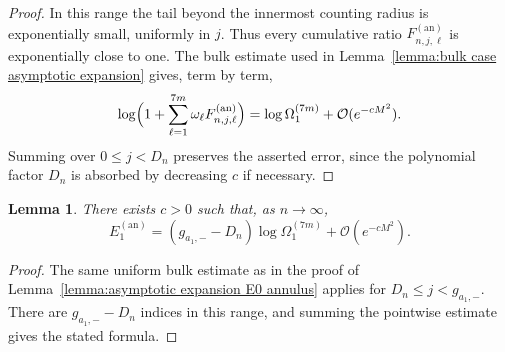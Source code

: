 \documentclass[a4paper]{article}
\newtheorem{lemma}[theorem]{Lemma}
\numberwithin{equation}{section}
\begin{document}
\begin{proof}
In this range the tail beyond the innermost counting radius is
exponentially small, uniformly in $j$.  Thus every cumulative ratio
$F_{n,j,\ell}^{(\mathrm{an})}$ is exponentially close to one.  The bulk
estimate used in Lemma~\ref{lemma:bulk case asymptotic expansion} gives,
term by term,
\[
 \log\Bigl(1+\sum_{\ell=1}^{7m}\omega_\ell
 F_{n,j,\ell}^{(\mathrm{an})}\Bigr)
 =\log\Omega_1^{(7m)}+\mathcal O(e^{-cM^2}).
\]
Summing over $0\le j<D_n$ preserves the asserted error, since the polynomial
factor $D_n$ is absorbed by decreasing $c$ if necessary.
\end{proof}

\begin{lemma}\label{lemma:asymptotic expansion E1 annulus}
There exists $c>0$ such that, as $n\to\infty$,
\[
E_{1}^{(\mathrm{an})}
=(g_{a_1,-}-D_n)\log \Omega_{1}^{(7m)}+\mathcal{O}(e^{-cM^2}).
\]

\end{lemma}



\begin{proof}
The same uniform bulk estimate as in the proof of
Lemma~\ref{lemma:asymptotic expansion E0 annulus} applies for
$D_n\le j<g_{a_1,-}$.  There are $g_{a_1,-}-D_n$ indices in this range, and
summing the pointwise estimate gives the stated formula.
\end{proof}
\end{document}
